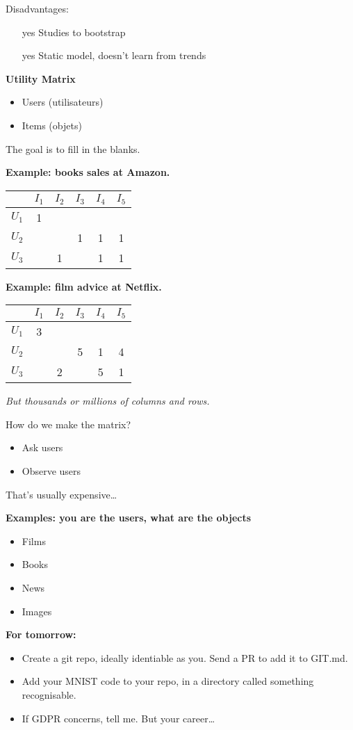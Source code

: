 Disadvantages:

\begin{itemize}
\item [yes] Studies to bootstrap
\item [yes] Static model, doesn't learn from trends
\end{itemize}

\textbf{Utility Matrix}

\begin{itemize}
\item Users (utilisateurs)
\item Items (objets)
\end{itemize}

The goal is to fill in the blanks.

\textbf{Example: books sales at Amazon.}

\begin{tabular}{l|ccccc}
  & $I_1$ & $I_2$ & $I_3$ & $I_4$ & $I_5$ \\
  \hline
  $U_1$ & 1 & & & & \\
  $U_2$ & & & 1 & 1 & 1 \\
  $U_3$ & & 1 & & 1 & 1
\end{tabular}

\textbf{Example: film advice at Netflix.}

\begin{tabular}{l|ccccc}
  & $I_1$ & $I_2$ & $I_3$ & $I_4$ & $I_5$ \\
  \hline
  $U_1$ & 3 & & & & \\
  $U_2$ & & & 5 & 1 & 4 \\
  $U_3$ & & 2 & & 5 & 1
\end{tabular}

{\it But thousands or millions of columns and rows.}

How do we make the matrix?
\begin{itemize}
\item Ask users
\item Observe users
\end{itemize}

That's usually expensive\dots

\textbf{Examples: you are the users, what are the objects}
\begin{itemize}
\item Films
\item Books
\item News
\item Images
\end{itemize}

\textbf{For tomorrow:}
\begin{itemize}
\item Create a git repo, ideally identiable as you.  Send a PR to add it to GIT.md.
\item Add your MNIST code to your repo, in a directory called something recognisable.
\item If GDPR concerns, tell me.  But your career\dots
\end{itemize}


